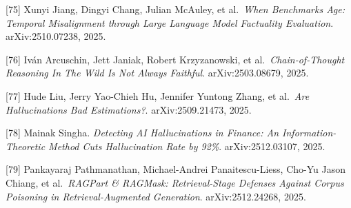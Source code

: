 {[}75{]} Xunyi Jiang, Dingyi Chang, Julian McAuley, et al.~\emph{When Benchmarks Age: Temporal Misalignment through Large Language Model Factuality Evaluation}. arXiv:2510.07238, 2025.

{[}76{]} Iván Arcuschin, Jett Janiak, Robert Krzyzanowski, et al.~\emph{Chain-of-Thought Reasoning In The Wild Is Not Always Faithful}. arXiv:2503.08679, 2025.

{[}77{]} Hude Liu, Jerry Yao-Chieh Hu, Jennifer Yuntong Zhang, et al.~\emph{Are Hallucinations Bad Estimations?}. arXiv:2509.21473, 2025.

{[}78{]} Mainak Singha. \emph{Detecting AI Hallucinations in Finance: An Information-Theoretic Method Cuts Hallucination Rate by 92\%}. arXiv:2512.03107, 2025.

{[}79{]} Pankayaraj Pathmanathan, Michael-Andrei Panaitescu-Liess, Cho-Yu Jason Chiang, et al.~\emph{RAGPart \& RAGMask: Retrieval-Stage Defenses Against Corpus Poisoning in Retrieval-Augmented Generation}. arXiv:2512.24268, 2025.

